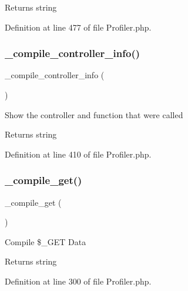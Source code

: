 \begin{DoxyReturn}{Returns}
string 
\end{DoxyReturn}


Definition at line 477 of file Profiler.\+php.

\mbox{\label{class_c_i___profiler_a46a079522432af283c844f043ba5a513}} 
\subsubsection{\texorpdfstring{\_compile\_controller\_info()}{\_compile\_controller\_info()}}
{\footnotesize\ttfamily \+\_\+compile\+\_\+controller\+\_\+info (\begin{DoxyParamCaption}{ }\end{DoxyParamCaption})\hspace{0.3cm}{\ttfamily [protected]}}

Show the controller and function that were called

\begin{DoxyReturn}{Returns}
string 
\end{DoxyReturn}


Definition at line 410 of file Profiler.\+php.

\mbox{\label{class_c_i___profiler_a94ef351d1234fe87ee3f5cd7c855f8a5}} 
\subsubsection{\texorpdfstring{\_compile\_get()}{\_compile\_get()}}
{\footnotesize\ttfamily \+\_\+compile\+\_\+get (\begin{DoxyParamCaption}{ }\end{DoxyParamCaption})\hspace{0.3cm}{\ttfamily [protected]}}

Compile \$\+\_\+\+G\+ET Data

\begin{DoxyReturn}{Returns}
string 
\end{DoxyReturn}


Definition at line 300 of file Profiler.\+php.

